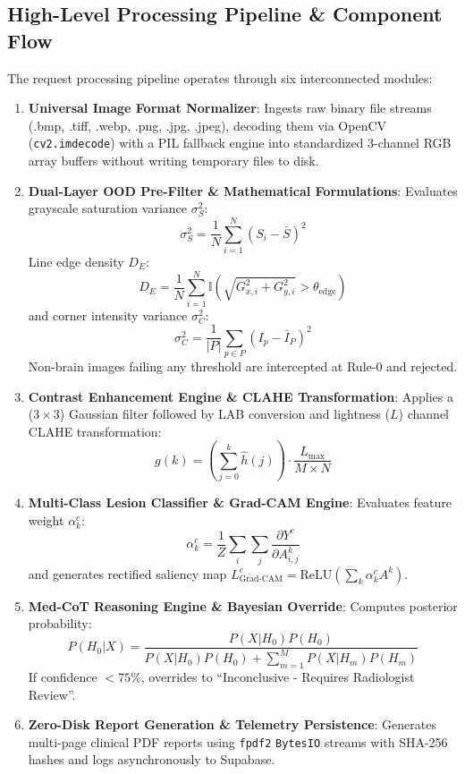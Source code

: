 \documentclass[conference]{IEEEtran}
\begin{document}
\subsection{High-Level Processing Pipeline \& Component Flow}
The request processing pipeline operates through six interconnected modules:
\begin{enumerate}
    \item \textbf{Universal Image Format Normalizer}: Ingests raw binary file streams (.bmp, .tiff, .webp, .png, .jpg, .jpeg), decoding them via OpenCV (\texttt{cv2.imdecode}) with a PIL fallback engine into standardized 3-channel RGB array buffers without writing temporary files to disk.
    \item \textbf{Dual-Layer OOD Pre-Filter \& Mathematical Formulations}: Evaluates grayscale saturation variance $\sigma_S^2$:
    \begin{equation}
    \sigma_S^2 = \frac{1}{N} \sum_{i=1}^N (S_i - \bar{S})^2
    \end{equation}
    Line edge density $D_E$:
    \begin{equation}
    D_E = \frac{1}{N} \sum_{i=1}^N \mathbb{I}\left( \sqrt{G_{x,i}^2 + G_{y,i}^2} > \theta_{\text{edge}} \right)
    \end{equation}
    and corner intensity variance $\sigma_C^2$:
    \begin{equation}
    \sigma_C^2 = \frac{1}{|P|} \sum_{p \in P} (I_p - \bar{I}_P)^2
    \end{equation}
    Non-brain images failing any threshold are intercepted at Rule-0 and rejected.
    \item \textbf{Contrast Enhancement Engine \& CLAHE Transformation}: Applies a ($3 \times 3$) Gaussian filter followed by LAB conversion and lightness ($L$) channel CLAHE transformation:
    \begin{equation}
    g(k) = \left( \sum_{j=0}^k \hat{h}(j) \right) \cdot \frac{L_{\text{max}}}{M \times N}
    \end{equation}
    \item \textbf{Multi-Class Lesion Classifier \& Grad-CAM Engine}: Evaluates feature weight $\alpha_k^c$:
    \begin{equation}
    \alpha_k^c = \frac{1}{Z} \sum_{i} \sum_{j} \frac{\partial Y^c}{\partial A_{i,j}^k}
    \end{equation}
    and generates rectified saliency map $L_{\text{Grad-CAM}}^c = \text{ReLU}\left( \sum_k \alpha_k^c A^k \right)$.
    \item \textbf{Med-CoT Reasoning Engine \& Bayesian Override}: Computes posterior probability:
    \begin{equation}
    P(H_0 | X) = \frac{P(X | H_0) P(H_0)}{P(X | H_0) P(H_0) + \sum_{m=1}^M P(X | H_m) P(H_m)}
    \end{equation}
    If confidence $< 75\%$, overrides to ``Inconclusive - Requires Radiologist Review''.
    \item \textbf{Zero-Disk Report Generation \& Telemetry Persistence}: Generates multi-page clinical PDF reports using \texttt{fpdf2} \texttt{BytesIO} streams with SHA-256 hashes and logs asynchronously to Supabase.
\end{enumerate}
\end{document}
